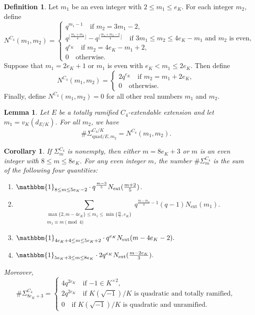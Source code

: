 \documentclass[11pt]{amsart}
\theoremstyle{theorem}
\newtheorem{lemma}[theorem]{Lemma}
\newtheorem{corollary}[theorem]{Corollary}
\theoremstyle{example}
\theoremstyle{definition}
\newtheorem{definition}[theorem]{Definition}
\numberwithin{theorem}{section}
\numberwithin{theorem}{section}
\newcommand{\ext}{\mathrm{ext}}
\newcommand{\quadr}{\mathrm{quad}}
\begin{document}
    

\begin{definition}
    \label{defi-N-C4}
    Let $m_1$ be an even integer with $2 \leq m_1 \leq e_K$. For each integer $m_2$, define 
    $$
    N^{C_4}(m_1,m_2) = \begin{cases}
        q^{m_1-1}\quad\text{if $m_2 = 3m_1 - 2$},
        \\
        q^{\lfloor \frac{m_1+m_2}{4}\rfloor} - q^{\lfloor \frac{m_1+m_2-2}{4}\rfloor} \quad\text{if $3m_1 \leq m_2 \leq 4e_K - m_1$ and $m_2$ is even},
        \\
        q^{e_K} \quad\text{if $m_2 = 4e_K - m_1 + 2$},
        \\
        0 \quad\text{otherwise}. 
    \end{cases}
    $$
    Suppose that $m_1 = 2e_K + 1$ or $m_1$ is even with $e_K < m_1 \leq 2e_K$. Then define 
    $$
    N^{C_4}(m_1,m_2) = \begin{cases}
        2q^{e_K}\quad\text{if $m_2 = m_1 + 2e_K$},
        \\
        0\quad\text{otherwise}. 
    \end{cases}
    $$
    Finally, define $N^{C_4}(m_1,m_2) = 0$ for all other real numbers $m_1$ and $m_2$. 
\end{definition}
\begin{lemma}
    \label{lem-N-E-m2}
    Let $E$ be a totally ramified $C_4$-extendable extension and let $m_1 = v_K(d_{E/K})$. For all $m_2$, we have 
    $$
    \#\Sigma_{\quadr/E,m_2}^{C_4/K} = N^{C_4}(m_1,m_2). 
    $$
\end{lemma}

\begin{corollary}
    \label{cor-size-of-Sigma-m-C4}
    If $\Sigma_{m}^{C_4}$ is nonempty, then either $m=8e_K + 3$ or $m$ is an even integer with $8 \leq m \leq 8e_K$. For any even integer $m$, the number $\# \Sigma^{C_4}_m$ is the sum of the following four quantities:
    \begin{enumerate}
        \item $\mathbbm{1}_{8\leq m \leq 5e_K - 2}\cdot q^{\frac{m-3}{5}}N_{\ext}(\frac{m+2}{5})$.
        \item $$\sum_{\substack{\max\{2, m-4e_K\}\leq m_1 \leq \min\{\frac{m}{5},e_K\} \\ m_1\equiv m\pmod{4}}} q^{\frac{m-m_1}{4} - 1}(q-1)N_{\ext}(m_1).$$ 
        \item $\mathbbm{1}_{4e_K + 4 \leq m \leq 5e_K + 2}\cdot q^{e_K} N_{\ext}(m - 4e_K - 2).$
        \item $
        \mathbbm{1}_{5e_K + 3 \leq m \leq 8e_K} \cdot 2q^{e_K}N_{\ext}(\frac{m-2e_K}{3}). 
        $
    \end{enumerate}
    Moreover, 
    $$
    \#\Sigma_{8e_K + 3}^{C_4} = \begin{cases}
        4q^{2e_K}\quad\text{if $-1 \in K^{\times 2}$},
        \\
        2q^{2e_K} \quad\text{if $K(\sqrt{-1})/K$ is quadratic and totally ramified},
        \\
        0\quad\text{if $K(\sqrt{-1})/K$ is quadratic and unramified}.
    \end{cases}
    $$
\end{corollary}
\end{document}
